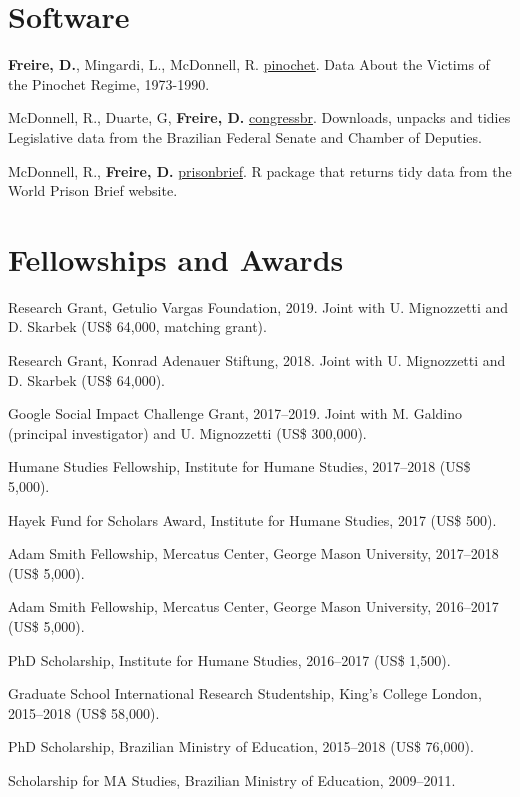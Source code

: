 \documentclass[a4paper]{article}
\renewenvironment{itemize}{
	\begin{list}{}{
			\setlength{\leftmargin}{1.5em}
		}
		}{
	\end{list}
}
\begin{document}
	\section*{Software}

	\begin{itemize}
		\item \textbf{Freire, D.}, Mingardi, L., McDonnell, R. \href{http://danilofreire.github.io/pinochet}{pinochet}. Data About the Victims of the Pinochet Regime, 1973-1990.
		\item McDonnell, R., Duarte, G, \textbf{Freire, D.} \href{https://github.com/RobertMyles/congressbr}{congressbr}. Downloads, unpacks and tidies Legislative data from the Brazilian Federal Senate and Chamber of Deputies.
		\item McDonnell, R., \textbf{Freire, D.} \href{http://danilofreire.github.io/prisonbrief}{prisonbrief}. R package that returns tidy data from the World Prison Brief website. 
	\end{itemize}

	\section*{Fellowships and Awards}

  \begin{itemize}
		\item Research Grant, Getulio Vargas Foundation, 2019. Joint with U. Mignozzetti and D. Skarbek (US\$ 64,000, matching grant).
		\item Research Grant, Konrad Adenauer Stiftung, 2018. Joint with U. Mignozzetti and D. Skarbek (US\$ 64,000).
		\item Google Social Impact Challenge Grant, 2017--2019. Joint with M. Galdino (principal investigator) and U. Mignozzetti (US\$ 300,000).
		\item Humane Studies Fellowship, Institute for Humane Studies, 2017--2018 (US\$ 5,000).
		\item Hayek Fund for Scholars Award, Institute for Humane Studies, 2017 (US\$ 500).
		\item Adam Smith Fellowship, Mercatus Center, George Mason University, 2017--2018 (US\$ 5,000).
		\item Adam Smith Fellowship, Mercatus Center, George Mason University, 2016--2017 (US\$ 5,000).
		\item PhD Scholarship, Institute for Humane Studies, 2016--2017 (US\$ 1,500).
		\item Graduate School International Research Studentship, King's College London, 2015--2018 (US\$ 58,000).
		\item PhD Scholarship, Brazilian Ministry of Education, 2015--2018 (US\$ 76,000).
		\item Scholarship for MA Studies, Brazilian Ministry of Education, 2009--2011.
	\end{itemize}
\end{document}
